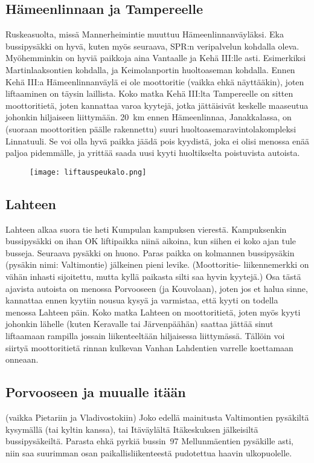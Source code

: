 \documentclass[../ala_hataile.tex]{subfiles}
\begin{document}
\subsection*{Hämeenlinnaan ja Tampereelle}
Ruskeasuolta, missä Mannerheimintie
muuttuu Hämeenlinnanväyläksi. Eka
bussipysäkki on hyvä, kuten myös seuraava,
SPR:n veripalvelun kohdalla oleva.
Myöhemminkin on hyviä paikkoja aina
Vantaalle ja Kehä III:lle asti. Esimerkiksi
Martinlaaksontien kohdalla, ja Keimolanportin
huoltoaseman kohdalla. Ennen Kehä
III:a Hämeenlinnanväylä ei ole moottoritie
(vaikka ehkä näyttääkin), joten liftaaminen
on täysin laillista. Koko matka Kehä III:lta
Tampereelle on sitten moottoritietä, joten
kannattaa varoa kyytejä, jotka jättäisivät
keskelle maaseutua johonkin hiljaiseen liittymään.
20~km ennen Hämeenlinnaa, Janakkalassa,
on (suoraan moottoritien päälle
rakennettu) suuri huoltoasemaravintolakompleksi
Linnatuuli. Se voi olla hyvä
paikka jäädä pois kyydistä, joka ei olisi
menossa enää paljoa pidemmälle, ja yrittää
saada uusi kyyti huoltikselta poistuvista
autoista.
\begin{figure}[!b]
	\centering
	\texttt{[image: liftauspeukalo.png]}
\end{figure}
\subsection*{Lahteen}
Lahteen alkaa suora tie heti Kumpulan
kampuksen vierestä. Kampuksenkin bussipysäkki
on ihan OK liftipaikka niinä aikoina,
kun siihen ei koko ajan tule busseja.
Seuraava pysäkki on huono. Paras paikka
on kolmannen bussipysäkin (pysäkin nimi:
Valtimontie) jälkeinen pieni levike. (Moottoritie-
liikennemerkki on vähän inhasti
sijoitettu, mutta kyllä paikasta silti saa hyvin
kyytejä.) Osa tästä ajavista autoista on
menossa Porvooseen (ja Kouvolaan), joten
jos et halua sinne, kannattaa ennen kyytiin
nousua kysyä ja varmistaa, että kyyti on todella
menossa Lahteen päin. Koko matka
Lahteen on moottoritietä, joten myös kyyti
johonkin lähelle (kuten Keravalle tai Järvenpäähän)
saattaa jättää sinut liftaamaan
rampilla jossain liikenteeltään hiljaisessa
liittymässä.
Tällöin voi siirtyä moottoritietä
rinnan kulkevan Vanhan Lahdentien varrelle
koettamaan onneaan.
\subsection*{Porvooseen ja muualle itään}
(vaikka Pietariin ja Vladivostokiin)
Joko edellä mainitusta Valtimontien
pysäkiltä kysymällä (tai kyltin kanssa), tai
Itäväylältä Itäkeskuksen jälkeisiltä bussipysäkeiltä.
Parasta ehkä pyrkiä bussin~97
Mellunmäentien pysäkille asti, niin saa
suurimman osan paikallisliikenteestä pudotettua
haavin ulkopuolelle.
\end{document}
